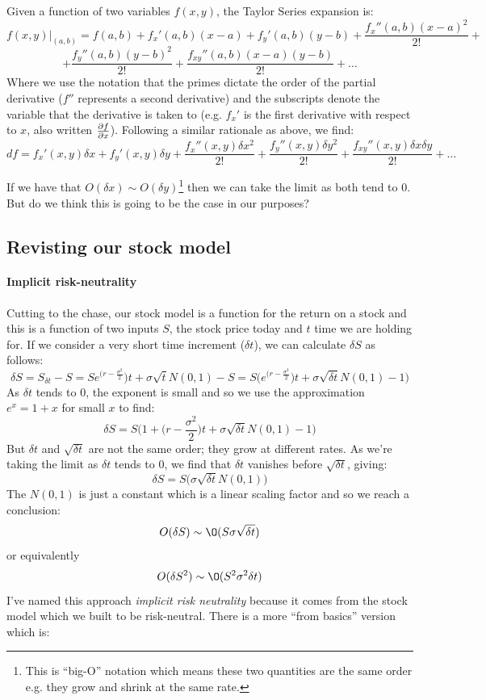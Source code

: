 \documentclass[../../Axiomathic.tex]{subfiles}
\begin{document}
\begin{example}
Given a function of two variables $f(x,y)$, the Taylor Series expansion is:
\[f(x,y)\vert_{(a,b)}= f(a,b)+f_x'(a,b)(x-a)+f_y'(a,b)(y-b)+\frac{f_x''(a,b)(x-a)^2}{2!}+\]
\[+\frac{f_y''(a,b)(y-b)^2}{2!}+\frac{f_{xy}''(a,b)(x-a)(y-b)}{2!}+\dots\]
Where we use the notation that the primes dictate the order of the partial derivative ($f''$ represents a second derivative) and the subscripts denote the variable that the derivative is taken to (e.g. $f_x'$ is the first derivative with respect to $x$, also written $\frac{\partial f}{\partial x}$).
Following a similar rationale as above, we find:
\[df = f_x'(x,y)\delta x+f_y'(x,y)\delta y+\frac{f_x''(x,y)\delta x^2}{2!}+\frac{f_y''(x,y)\delta y^2}{2!}+\frac{f_{xy}''(x,y)\delta x\delta y}{2!}+\dots\]
\end{example}
If we have that $O(\delta x)\sim O(\delta y)$\footnote{This is ``big-O'' notation which means these two quantities are the same order e.g. they grow and shrink at the same rate.} then we can take the limit as both tend to 0. But do we think this is going to be the case in our purposes?
\subsection{Revisting our stock model}
\paragraph{Implicit risk-neutrality}
Cutting to the chase, our stock model is a function for the return on a stock and this is a function of two inputs $S$, the stock price today and $t$ time we are holding for. If we consider a very short time increment ($\delta t$), we can calculate $\delta S$ as follows:
\[ \delta S = S_{\delta t}-S = Se^{(r-\frac{\sigma^2}{2}})t + \sigma \sqrt t N(0,1) - S = S\biggl (e^{(r-\frac{\sigma^2}{2}})t + \sigma \sqrt{\delta t} N(0,1) - 1 \biggr) \] 
As $\delta t$ tends to 0, the exponent is small and so we use the approximation $e^x = 1+x$ for small $x$ to find:
\[ \delta S = S\biggl (1+{(r-\frac{\sigma^2}{2}})t + \sigma \sqrt{\delta t} N(0,1) - 1 \biggr) \] 
But $\delta t$ and $\sqrt{\delta t}$ are not the same order; they grow at different rates. As we're taking the limit as $\delta t$ tends to 0, we find that $\delta t$ vanishes before $\sqrt{\delta t}$, giving:
\[ \delta S = S\biggl ( \sigma \sqrt{\delta t} N(0,1) \biggr) \] 
The $N(0,1)$ is just a constant which is a linear scaling factor and so we reach a conclusion: 
\[O(\delta S) \sim \O(S \sigma \sqrt{\delta t})\] or equivalently
\[O(\delta S^2) \sim \O(S^2 \sigma^2\delta t) \]
I've named this approach \textit{implicit risk neutrality} because it comes from the stock model which we built to be risk-neutral. There is a more ``from basics'' version which is:
\end{document}
